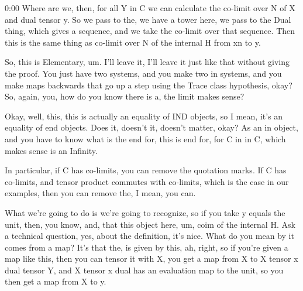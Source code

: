 \begin{unfinished}{0:00}
Where are we, then, for all Y in C we can calculate the co-limit over N of X and dual tensor y. So we pass to the, we have a tower here, we pass to the Dual thing, which gives a sequence, and we take the co-limit over that sequence. Then this is the same thing as co-limit over N of the internal H from xn to y.

So, this is Elementary, um. I'll leave it, I'll leave it just like that without giving the proof. You just have two systems, and you make two in systems, and you make maps backwards that go up a step using the Trace class hypothesis, okay? So, again, you, how do you know there is a, the limit makes sense?

Okay, well, this, this is actually an equality of IND objects, so I mean, it's an equality of end objects. Does it, doesn't it, doesn't matter, okay? As an in object, and you have to know what is the end for, this is end for, for C in in C, which makes sense is an Infinity.

In particular, if C has co-limits, you can remove the quotation marks. If C has co-limits, and tensor product commutes with co-limits, which is the case in our examples, then you can remove the, I mean, you can.

What we're going to do is we're going to recognize, so if you take y equals the unit, then, you know, and, that this object here, um, coim of the internal H. Ask a technical question, yes, about the definition, it's nice. What do you mean by it comes from a map? It's that the, is given by this, ah, right, so if you're given a map like this, then you can tensor it with X, you get a map from X to X tensor x dual tensor Y, and X tensor x dual has an evaluation map to the unit, so you then get a map from X to y.


\end{unfinished}
